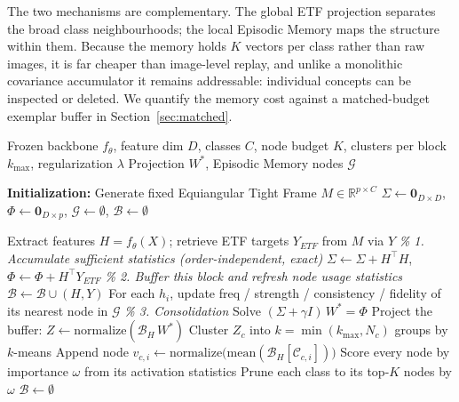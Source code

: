 The two mechanisms are complementary. The global ETF projection separates the broad class neighbourhoods; the local Episodic Memory maps the structure within them. Because the memory holds $K$ vectors per class rather than raw images, it is far cheaper than image-level replay, and unlike a monolithic covariance accumulator it remains addressable: individual concepts can be inspected or deleted. We quantify the memory cost against a matched-budget exemplar buffer in Section~\ref{sec:matched}.

\begin{algorithm}[htbp]
\caption{MAYA: Online Training Phase}
\label{alg:maya_train}
\begin{algorithmic}[1]
\REQUIRE Frozen backbone $f_\theta$, feature dim $D$, classes $C$, node budget $K$, clusters per block $k_{\max}$, regularization $\lambda$
\ENSURE Projection $W^*$, Episodic Memory nodes $\mathcal{G}$

\STATE \textbf{Initialization:}
\STATE Generate fixed Equiangular Tight Frame $M \in \mathbb{R}^{p \times C}$
\STATE $\Sigma \gets \mathbf{0}_{D \times D}$, \quad $\Phi \gets \mathbf{0}_{D \times p}$, \quad $\mathcal{G} \gets \emptyset$, \quad $\mathcal{B} \gets \emptyset$
\STATE

    \STATE Extract features $H = f_\theta(X)$; retrieve ETF targets $Y_{ETF}$ from $M$ via $Y$
    \STATE \textit{\% 1. Accumulate sufficient statistics (order-independent, exact)}
    \STATE $\Sigma \gets \Sigma + H^\top H$, \quad $\Phi \gets \Phi + H^\top Y_{ETF}$
    \STATE \textit{\% 2. Buffer this block and refresh node usage statistics}
    \STATE $\mathcal{B} \gets \mathcal{B} \cup (H, Y)$
    \STATE For each $h_i$, update freq / strength / consistency / fidelity of its nearest node in $\mathcal{G}$
    \STATE
        \STATE \textit{\% 3. Consolidation}
        \STATE Solve $(\Sigma + \gamma I)\, W^* = \Phi$ 
        \STATE Project the buffer: $Z \gets \mathrm{normalize}(\mathcal{B}_H \, W^*)$
            \STATE Cluster $Z_c$ into $k = \min(k_{\max}, N_c)$ groups by $k$-means 
                \STATE Append node $v_{c,i} \gets \mathrm{normalize}\big(\mathrm{mean}(\mathcal{B}_H[\mathcal{C}_{c,i}])\big)$ 
            \ENDFOR
        \ENDFOR
        \STATE Score every node by importance $\omega$ from its activation statistics
        \STATE Prune each class to its top-$K$ nodes by $\omega$
        \STATE $\mathcal{B} \gets \emptyset$
    \ENDIF
\ENDFOR
\end{algorithmic}
\end{algorithm}


